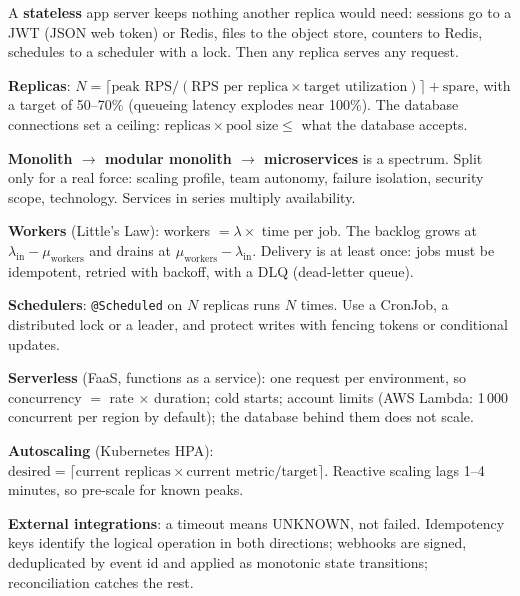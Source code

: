 \stages{\stEstimate\ \stDesign\ \stDeep}

\begin{know}
  \item A \textbf{stateless} app server keeps nothing another replica would need: sessions go to a JWT (JSON web token) or Redis, files to the object store, counters to Redis, schedules to a scheduler with a lock. Then any replica serves any request.
  \item \textbf{Replicas}: $N = \lceil \text{peak RPS} / (\text{RPS per replica} \times \text{target utilization}) \rceil + \text{spare}$, with a target of 50--70\% (queueing latency explodes near 100\%). The database connections set a ceiling: $\text{replicas} \times \text{pool size} \le$ what the database accepts.
  \item \textbf{Monolith $\to$ modular monolith $\to$ microservices} is a spectrum. Split only for a real force: scaling profile, team autonomy, failure isolation, security scope, technology. Services in series multiply availability.
  \item \textbf{Workers} (Little's Law): workers $= \lambda \times$ time per job. The backlog grows at $\lambda_\text{in} - \mu_\text{workers}$ and drains at $\mu_\text{workers} - \lambda_\text{in}$. Delivery is at least once: jobs must be idempotent, retried with backoff, with a DLQ (dead-letter queue).
  \item \textbf{Schedulers}: \texttt{@Scheduled} on $N$ replicas runs $N$ times. Use a CronJob, a distributed lock or a leader, and protect writes with fencing tokens or conditional updates.
  \item \textbf{Serverless} (FaaS, functions as a service): one request per environment, so concurrency $=$ rate $\times$ duration; cold starts; account limits (AWS Lambda: 1\,000 concurrent per region by default); the database behind them does not scale.
  \item \textbf{Autoscaling} (Kubernetes HPA): $\text{desired} = \lceil \text{current replicas} \times \text{current metric} / \text{target} \rceil$. Reactive scaling lags 1--4 minutes, so pre-scale for known peaks.
  \item \textbf{External integrations}: a timeout means UNKNOWN, not failed. Idempotency keys identify the logical operation in both directions; webhooks are signed, deduplicated by event id and applied as monotonic state transitions; reconciliation catches the rest.
\end{know}

